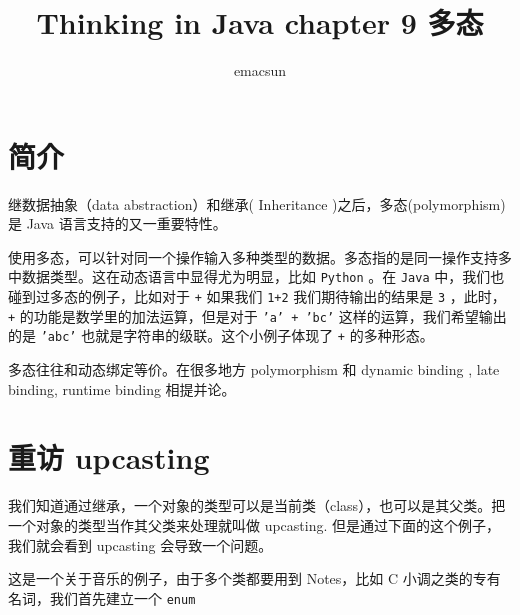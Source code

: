 \documentclass[10pt,a4paper,UTF8]{article}
\author{emacsun}
\date{}
\title{Thinking in Java chapter 9 多态}
\begin{document}
\maketitle
\tableofcontents
{}

\section{简介}
\label{sec:org5d6d00b}


继数据抽象（data abstraction）和继承( Inheritance )之后，多态(polymorphism)是 Java 语言支持的又一重要特性。

使用多态，可以针对同一个操作输入多种类型的数据。多态指的是同一操作支持多中数据类型。这在动态语言中显得尤为明显，比如 \texttt{Python} 。在 \texttt{Java} 中，我们也碰到过多态的例子，比如对于 \texttt{+} 如果我们 \texttt{1+2} 我们期待输出的结果是 \texttt{3} ，此时， \texttt{+} 的功能是数学里的加法运算，但是对于 \texttt{'a' + 'bc'} 这样的运算，我们希望输出的是 \texttt{'abc'} 也就是字符串的级联。这个小例子体现了 \texttt{+} 的多种形态。

多态往往和动态绑定等价。在很多地方 polymorphism 和 dynamic binding , late binding, runtime binding 相提并论。
\section{重访 upcasting}
\label{sec:orge821caa}


我们知道通过继承，一个对象的类型可以是当前类（class），也可以是其父类。把一个对象的类型当作其父类来处理就叫做 upcasting. 但是通过下面的这个例子，我们就会看到 upcasting 会导致一个问题。

这是一个关于音乐的例子，由于多个类都要用到 Notes，比如 C 小调之类的专有名词，我们首先建立一个 \texttt{enum}
\end{document}
